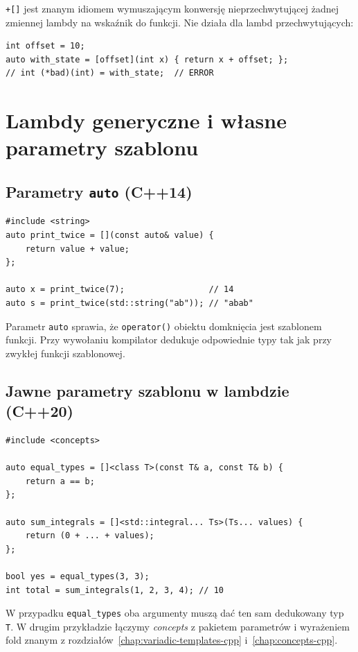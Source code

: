 \texttt{+[]} jest znanym idiomem wymuszającym konwersję
nieprzechwytującej żadnej zmiennej lambdy na wskaźnik do funkcji.
Nie działa dla lambd przechwytujących:

\begin{lstlisting}
int offset = 10;
auto with_state = [offset](int x) { return x + offset; };
// int (*bad)(int) = with_state;  // ERROR
\end{lstlisting}

\section{Lambdy generyczne i własne parametry szablonu}
\label{sec:lambda-generic}

\subsection{Parametry \texttt{auto} (C++14)}

\begin{lstlisting}
#include <string>
auto print_twice = [](const auto& value) {
    return value + value;
};

auto x = print_twice(7);                 // 14
auto s = print_twice(std::string("ab")); // "abab"
\end{lstlisting}

Parametr \texttt{auto} sprawia, że \texttt{operator()} obiektu domknięcia
jest szablonem funkcji. Przy wywołaniu kompilator dedukuje odpowiednie
typy tak jak przy zwykłej funkcji szablonowej.

\subsection{Jawne parametry szablonu w lambdzie (C++20)}

\begin{lstlisting}
#include <concepts>

auto equal_types = []<class T>(const T& a, const T& b) {
    return a == b;
};

auto sum_integrals = []<std::integral... Ts>(Ts... values) {
    return (0 + ... + values);
};

bool yes = equal_types(3, 3);
int total = sum_integrals(1, 2, 3, 4); // 10
\end{lstlisting}

W przypadku \texttt{equal\_types} oba argumenty muszą dać ten sam
dedukowany typ \texttt{T}. W drugim przykładzie łączymy \emph{concepts}
z pakietem parametrów i wyrażeniem fold znanym z
rozdziałów~\ref{chap:variadic-templates-cpp} i~\ref{chap:concepts-cpp}.

